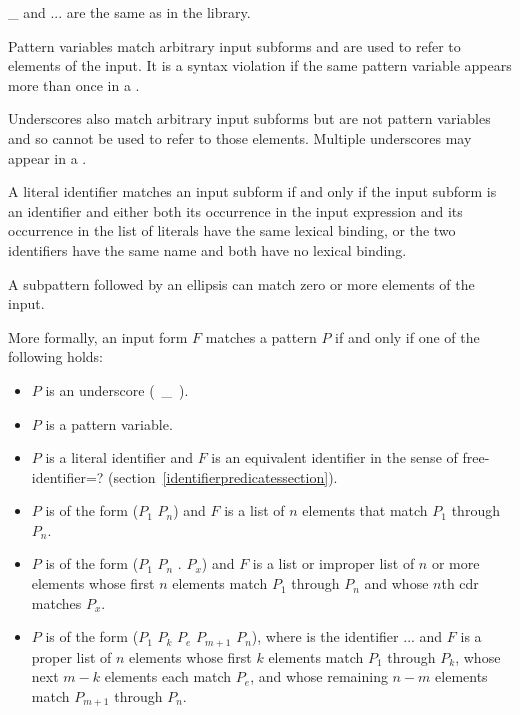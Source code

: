 \begin{entry}
{\cf \_} and {\cf ...} are the same as in the  library.

Pattern variables match arbitrary input subforms and
are used to refer to elements of the input.
It is a syntax violation if the same pattern variable appears more than once in a
.

Underscores also match arbitrary input subforms but are not pattern variables
and so cannot be used to refer to those elements.
Multiple underscores may appear in a .

A literal identifier matches an input subform if and only if the input
subform is an identifier and either both its occurrence in the input
expression and its occurrence in the list of literals have the same
lexical binding, or the two identifiers have the same name and both have
no lexical binding.

A subpattern followed by an ellipsis can match zero or more elements of
the input.

More formally, an input form $F$ matches a pattern $P$ if and only if
one of the following holds:

\begin{itemize}
\item $P$ is an underscore (~{\cf \_}~).

\item $P$ is a pattern variable.

\item $P$ is a literal identifier
and $F$ is an equivalent identifier in the
sense of {\cf free-identifier=?}
(section~\ref{identifierpredicatessection}).

\item $P$ is of the form
{\cf ($P_1$ \dotsfoo{} $P_n$)}
and $F$ is a list of $n$ elements that match $P_1$ through
$P_n$.

\item $P$ is of the form
{\cf ($P_1$ \dotsfoo{} $P_n$ . $P_x$)}
and $F$ is a list or improper list of $n$ or more elements
whose first $n$ elements match $P_1$ through $P_n$
and
whose $n$th cdr matches $P_x$.

\item $P$ is of the form
{\cf ($P_1$ \dotsfoo{} $P_k$ $P_e$  $P_{m+1}$ \dotsfoo{} $P_n$)},
where  is the identifier {\cf ...}
and $F$ is a proper list of $n$
elements whose first $k$ elements match $P_1$ through $P_k$,
whose next $m-k$ elements each match $P_e$,
and
whose remaining $n-m$ elements match $P_{m+1}$ through $P_n$.


\end{itemize}
\end{entry}
